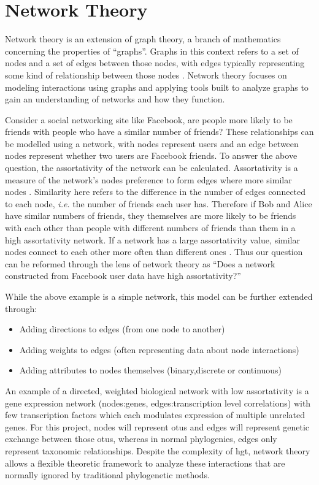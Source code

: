 \section*{Network Theory}
Network theory is an extension of graph theory, a branch of mathematics concerning the properties of ``graphs''.
Graphs in this context refers to a set of nodes and a set of edges between those nodes, with edges typically representing some kind of relationship between those nodes \citep{netgen}.
Network theory focuses on modeling interactions using graphs and applying tools built to analyze graphs to gain an understanding of networks and how they function.\par
Consider a social networking site like Facebook, are people more likely to be friends with people who have a similar number of friends?
These relationships can be modelled using a network, with nodes represent users and an edge between nodes represent whether two users are Facebook friends.
To answer the above question, the assortativity of the network can be calculated.
Assortativity is a measure of the network's nodes preference to form edges where more similar nodes \citep{netgen}.
Similarity here refers to the difference in the number of edges connected to each node, \textit{i.e.} the number of friends each user has.
Therefore if Bob and Alice have similar numbers of friends, they themselves are more likely to be friends with each other than people with different numbers of friends than them in a high assortativity network.
If a network has a large assortativity value, similar nodes connect to each other more often than different ones \citep{netgen}.
Thus our question can be reformed through the lens of network theory as ``Does a network constructed from Facebook user data have high assortativity?''
\begin{center}
\end{center}
While the above example is a simple network, this model can be further extended through:
\begin{itemize}
    \item Adding directions to edges (from one node to another)
    \item Adding weights to edges (often representing data about node interactions)
    \item Adding attributes to nodes themselves (binary,discrete or continuous)
\end{itemize}
An example of a directed, weighted biological network with low assortativity is a gene expression network (nodes:genes, edges:transcription level correlations) with few transcription factors which each modulates expression of multiple unrelated genes.
For this project, nodes will represent \ac{otu}s and edges will represent genetic exchange between those \ac{otu}s, whereas in normal phylogenies, edges only represent taxonomic relationships.
Despite the complexity of \ac{hgt}, network theory allows a flexible theoretic framework to analyze these interactions that are normally ignored by traditional phylogenetic methods.


